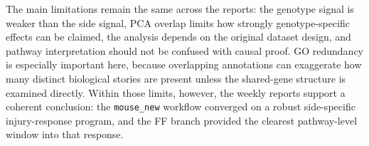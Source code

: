 \documentclass[12pt]{article}
\DeclareRobustCommand{\artifact}[1]{\texttt{#1}}
\begin{document}
The main limitations remain the same across the reports: the genotype signal is weaker than the side signal, PCA overlap limits how strongly genotype-specific effects can be claimed, the analysis depends on the original dataset design, and pathway interpretation should not be confused with causal proof. GO redundancy is especially important here, because overlapping annotations can exaggerate how many distinct biological stories are present unless the shared-gene structure is examined directly. Within those limits, however, the weekly reports support a coherent conclusion: the \artifact{mouse\_new} workflow converged on a robust side-specific injury-response program, and the FF branch provided the clearest pathway-level window into that response.

\printbibliography[title={References}]
\end{document}
